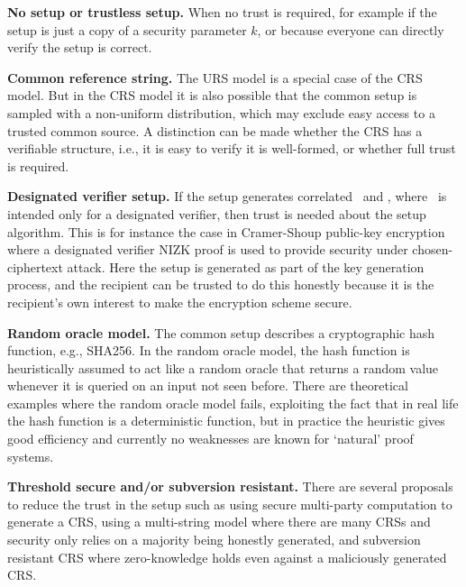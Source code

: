 \begin{bulletize}

	\item \textbf{No setup or trustless setup.}
	When no trust is required, for example if the setup is just a copy of a security parameter $k$, or because everyone can directly verify the setup is correct.
    
	\item {}

  \item \textbf{Common reference string.}
	The URS model is a special case of the CRS model. 
	But in the CRS model it is also possible that the common setup is sampled with a non-uniform distribution, which may exclude easy access to a trusted common source. 
	A distinction can be made whether the CRS has a verifiable structure, i.e., it is easy to verify it is well-formed, or whether full trust is required.
    
	\item \textbf{Designated verifier setup.}
	If the setup generates correlated \setP\ and \setV, where \setV\ is intended only for a designated verifier, then trust is needed about the setup algorithm. 
	This is for instance the case in Cramer-Shoup public-key encryption where a designated verifier NIZK proof is used to provide security under chosen-ciphertext attack. 
	Here the setup is generated as part of the key generation process, and the recipient can be trusted to do this honestly because it is the recipient's own interest to make the encryption scheme secure.
    
	\item \textbf{Random oracle model.}
	The common setup describes a cryptographic hash function, e.g., SHA256. 
	In the random oracle model, the hash function is heuristically assumed to act like a random oracle that returns a random value whenever it is queried on an input not seen before. 
	There are theoretical examples where the random oracle model fails, exploiting the fact that in real life the hash function is a deterministic function, but in practice the heuristic gives good efficiency and currently no weaknesses are known for `natural' proof systems.
    
	\item \textbf{Threshold secure and/or subversion resistant.} 
	There are several proposals to reduce the trust in the setup such as using secure multi-party computation to generate a CRS, using a multi-string model where there are many CRSs and security only relies on a majority being honestly generated, and subversion resistant CRS where zero-knowledge holds even against a maliciously generated CRS.
\end{bulletize}
